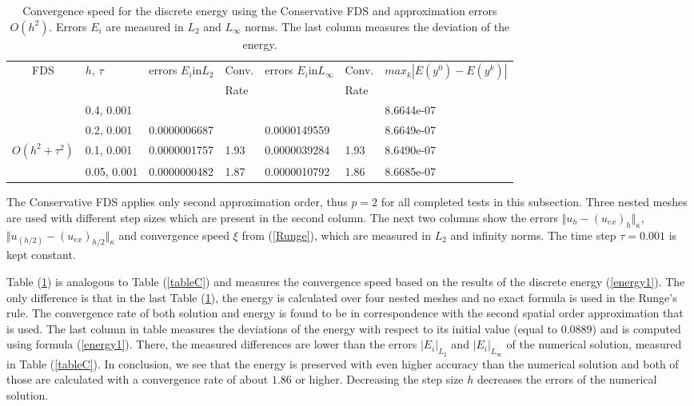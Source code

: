 \documentclass[%
 aip,
cp,  
 amsmath,amssymb,
 reprint,
]{iopconfser}
\newcommand{\rf}[1]{(\ref{#1})}
\begin{document}
\begin{table}[ht]
\centering
\small
		\begin{tabular}{||c|l|ll|ll|l||}
			\hline
			\hline
      \multirow{2  }{*}{FDS}        & \multirow{2  }{*}{$h$, $\tau$}  & \multirow{2  }{*}{errors $E_i$in$L_2$}  &Conv.& \multirow{2  }{*}{errors $E_i$in$L_\infty$}  &Conv.   & \multirow{2  }{*}{ $max_k|E(y^{0}) - E(y^k)|$} \\
	                                        &                                                     &                                                                 &  Rate &                                                                       & Rate & \\
   			\hline 
					\hline 
                                   &0.4, 0.001         &                    &                &                  &         &  8.6644e-07        \\
                                   &0.2, 0.001        & 0.0000006687  &                & 0.0000149559   &       & 8.6649e-07     \\
     $O(h^2 + \tau^ 2)$ &0.1, 0.001      & 0.0000001757   & 1.93       & 0.0000039284 & 1.93  & 8.6490e-07 \\
                                     &0.05, 0.001  & 0.0000000482   & 1.87       & 0.0000010792  & 1.86  & 8.6685e-07 \\
	   \hline
			\hline 
		\end{tabular}
		\caption{ Convergence speed for the discrete energy using the Conservative FDS and approximation errors $O(h^{2})$. Errors $E_i$ are measured in $L_2$ and $L_\infty$ norms. The last column measures the deviation of the energy. }
\label{tableD}
\end{table}
The Conservative FDS applies only second approximation order, thus $p=2$ for all completed tests in this subsection. Three nested meshes are used with different step sizes which are present in the second column. The next two columns show the errors $\Vert u_{h} - (u_{ex})_{h} \Vert_\kappa$, $\Vert  u_{(h/2)} - (u_{ex})_{h/2} \Vert_\kappa$ and convergence speed $\xi$ from \rf{Runge}, which are measured in $L_2$ and infinity norms. The time step $\tau = 0.001$ is kept constant.

Table \rf{tableD} is analogous to Table \rf{tableC} and measures the convergence speed based on the results of the discrete energy \rf{energy1}. The only difference is that in the last Table \rf{tableD}, the energy is calculated over four nested meshes and no exact formula is used in the Runge's rule. The convergence rate of both solution and energy is found to be in correspondence with the second spatial order approximation that is used.
The last column in table measures the deviations of the energy with respect to its initial value (equal to $0.0889$) and is computed using formula \rf{energy1}. There, the measured differences are lower than the  errors $|E_i|_{L_2}$ and $|E_i|_{L_\infty}$ of the numerical solution, measured in Table \rf{tableC}. In conclusion, we see that the energy is preserved with even higher accuracy than the numerical solution and both of those are calculated with a convergence rate of about $1.86$ or higher. Decreasing the step size $h$ decreases the errors of the numerical solution.
\end{document}
